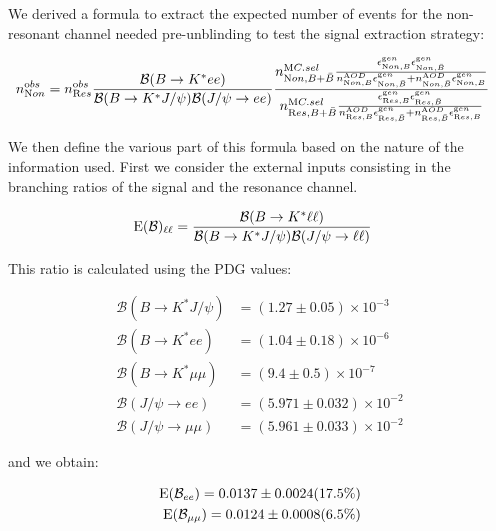 We derived a formula to extract the expected number of events for the
non-resonant channel needed pre-unblinding to test the signal extraction
strategy:

\begin{align}
n^{\textrm obs}_{\textrm Non} &= 
n^{\textrm obs}_{\textrm Res}
\frac{\mathcal{B}(B\to K^*ee)}{\mathcal{B}(B\to K^*J/\psi)\mathcal{B}(J/\psi\to ee)}
\frac{n_{{\textrm Non},B+\bar B}^{\textrm MC.sel}
\frac{\epsilon^{\textrm gen}_{{\textrm Non},B}\epsilon^{\textrm gen}_{{\textrm Non},\bar{B}}}{n_{{\textrm Non},B}^{\textrm AOD}\epsilon^{\textrm gen}_{{\textrm Non},\bar{B}} + n_{{\textrm Non},\bar{B}}^{\textrm AOD}\epsilon^{\textrm gen}_{{\textrm Non},B}}}{
n_{{\textrm Res},B+\bar B}^{\textrm MC.sel}
\frac{\epsilon^{\textrm gen}_{{\textrm Res},B}\epsilon^{\textrm gen}_{{\textrm Res},\bar{B}}}{n_{{\textrm Res},B}^{\textrm AOD}\epsilon^{\textrm gen}_{{\textrm Res},\bar{B}} + n_{{\textrm Res},\bar{B}}^{\textrm AOD}\epsilon^{\textrm gen}_{{\textrm Res},B}}}
\end{align}

We then define the various part of this formula based on the nature of
the information used. First we consider the external inputs consisting
in the branching ratios of the signal and the resonance channel.

\begin{align}
{\textrm E}(\mathcal{B})_{\ell\ell} &= 
\frac{\mathcal{B}(B\to K^*\ell\ell)}{\mathcal{B}(B\to K^*J/\psi)\mathcal{B}(J/\psi\to \ell\ell)}
\end{align}

This ratio is calculated using the PDG values:

\begin{align}
\mathcal{B}(B\to K^* J/\psi) &= (1.27\pm 0.05)\times 10^{-3}\\
\mathcal{B}(B\to K^* ee) &= (1.04 \pm {0.18})\times 10^{-6}\\
\mathcal{B}(B\to K^*\mu\mu)&= (9.4\pm0.5 )\times 10^{-7}\\
\mathcal{B}(J/\psi \to ee) &= (5.971\pm 0.032) \times 10^{-2}\\
\mathcal{B}(J/\psi \to \mu\mu) &= (5.961\pm 0.033)\times 10^{-2}
\end{align}

and we obtain:

\begin{align}
{\textrm E}(\mathcal{B}_{ee}) = 0.0137 \pm 0.0024 (17.5\%)\\
{\textrm E}(\mathcal{B}_{\mu\mu}) = 0.0124 \pm 0.0008 (6.5\%)
\end{align}

